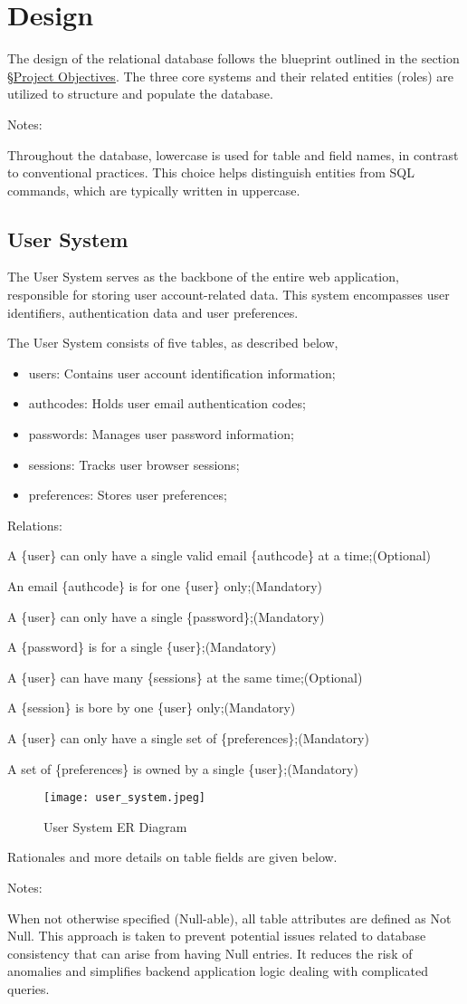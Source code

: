 \documentclass[12pt]{report}
\newcommand{\n}{\par}
\newcommand{\br}{\n\vspace{1 em}\n}
\begin{document}
\section{Design} \label{data-layer.design}
The design of the relational database follows the blueprint outlined in the section \S \hyperref[overview.project-objectives]{Project Objectives}.
The three core systems and their related entities (roles) are utilized to structure and populate the database.
\br
Notes:\n
Throughout the database, lowercase is used for table and field names, in contrast to conventional practices.
This choice helps distinguish entities from SQL commands, which are typically written in uppercase.


\subsection{User System} \label{data-layer.design.user-system}
The User System serves as the backbone of the entire web application, responsible for storing user account-related data.
This system encompasses user identifiers, authentication data and user preferences.
\br
The User System consists of five tables, as described below,
\begin{itemize}
	\item users: Contains user account identification information;
	\item authcodes: Holds user email authentication codes;
	\item passwords: Manages user password information;
	\item sessions: Tracks user browser sessions;
	\item preferences: Stores user preferences;
\end{itemize}
Relations:\n
A \{user\} can only have a single valid email \{authcode\} at a time;\null\hfill (Optional)\n
An email \{authcode\} is for one \{user\} only;\null\hfill (Mandatory)
\br
A \{user\} can only have a single \{password\};\null\hfill (Mandatory)\n
A \{password\} is for a single \{user\};\null\hfill (Mandatory)
\br
A \{user\} can have many \{sessions\} at the same time;\null\hfill (Optional)\n
A \{session\} is bore by one \{user\} only;\null\hfill (Mandatory)
\br
A \{user\} can only have a single set of \{preferences\};\null\hfill (Mandatory)\n
A set of \{preferences\} is owned by a single \{user\};\null\hfill (Mandatory)
\br
\begin{figure}[h]
	\centering
	\texttt{[image: user\_system.jpeg]}
	\caption{User System ER Diagram}
	\label{fig:user-system-er}
\end{figure}
\br
Rationales and more details on table fields are given below.\n
Notes:\n
When not otherwise specified (Null-able), all table attributes are defined as Not Null.
This approach is taken to prevent potential issues related to database consistency that can arise from having Null entries.
It reduces the risk of anomalies and simplifies backend application logic dealing with complicated queries.
\end{document}
